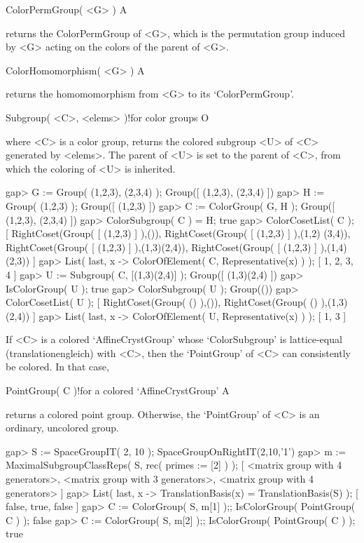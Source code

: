 \>ColorPermGroup( <G> ) A

returns the ColorPermGroup of <G>, which is the permutation group 
induced by <G> acting on the colors of the parent of <G>.

\>ColorHomomorphism( <G> ) A

returns the homomomorphism from <G> to its `ColorPermGroup'.

\>Subgroup( <C>, <elems> )!{for color groups} O

where <C> is a color group, returns the colored subgroup <U> of <C>
generated by <elems>. The parent of <U> is set to the parent of <C>, 
from which the coloring of <U> is inherited.

\beginexample
gap> G := Group(  (1,2,3), (2,3,4) );
Group([ (1,2,3), (2,3,4) ])
gap> H := Group( (1,2,3) ); 
Group([ (1,2,3) ])
gap> C := ColorGroup( G, H );
Group([ (1,2,3), (2,3,4) ])
gap> ColorSubgroup( C ) = H;
true
gap> ColorCosetList( C );
[ RightCoset(Group( [ (1,2,3) ] ),()), RightCoset(Group( [ (1,2,3) ] ),(1,2)
    (3,4)), RightCoset(Group( [ (1,2,3) ] ),(1,3)(2,4)), 
  RightCoset(Group( [ (1,2,3) ] ),(1,4)(2,3)) ]
gap> List( last, x -> ColorOfElement( C, Representative(x) ) );
[ 1, 2, 3, 4 ]
gap> U := Subgroup( C, [(1,3)(2,4)] );
Group([ (1,3)(2,4) ])
gap> IsColorGroup( U );
true
gap> ColorSubgroup( U );
Group(())
gap> ColorCosetList( U );
[ RightCoset(Group( () ),()), RightCoset(Group( () ),(1,3)(2,4)) ]
gap> List( last, x -> ColorOfElement( U, Representative(x) ) );
[ 1, 3 ]
\endexample


If <C> is a colored `AffineCrystGroup' whose `ColorSubgroup' is 
lattice-equal (translationengleich) with <C>, then the `PointGroup' of 
<C> can consistently be colored. In that case,

\>PointGroup( C )!{for a colored `AffineCrystGroup'} A

returns a colored point group. Otherwise, the `PointGroup' of <C> is
an ordinary, uncolored group.

\beginexample
gap> S := SpaceGroupIT( 2, 10 );                                  
SpaceGroupOnRightIT(2,10,'1')
gap> m := MaximalSubgroupClassReps( S, rec( primes := [2] ) );    
[ <matrix group with 4 generators>, <matrix group with 3 generators>, 
  <matrix group with 4 generators> ]
gap> List( last, x -> TranslationBasis(x) = TranslationBasis(S) );
[ false, true, false ]
gap> C := ColorGroup( S, m[1] );; IsColorGroup( PointGroup( C ) );
false
gap> C := ColorGroup( S, m[2] );; IsColorGroup( PointGroup( C ) );
true
\endexample

